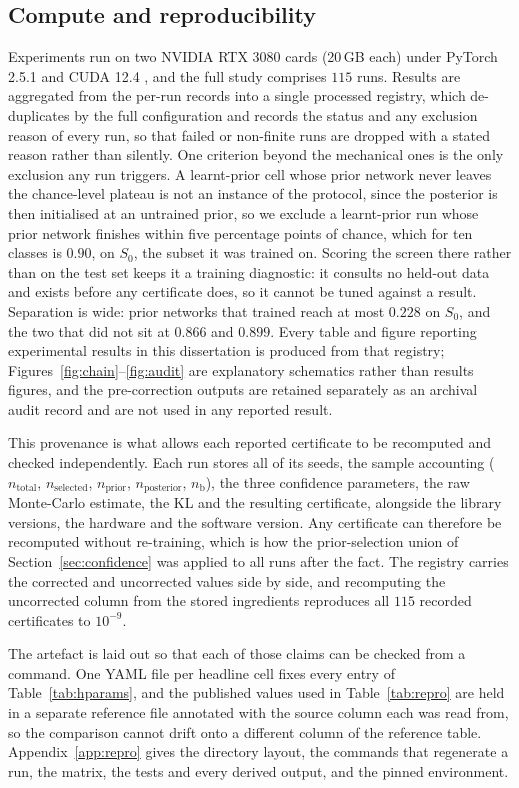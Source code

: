 \subsection{Compute and reproducibility}\label{sec:compute}

Experiments run on two NVIDIA RTX 3080 cards (20\,GB each) under PyTorch 2.5.1
and CUDA 12.4 \parencite{paszke2019}, and the full study comprises $115$ runs. Results are
aggregated from the per-run records into a single processed registry, which
de-duplicates by the full configuration and records the status and any exclusion
reason of every run, so that failed or non-finite runs are dropped with a stated
reason rather than silently. One criterion beyond the mechanical ones is the only
exclusion any run triggers. A
learnt-prior cell whose prior network never leaves the chance-level plateau is
not an instance of the protocol, since the posterior is then initialised at an
untrained prior, so we exclude a learnt-prior run whose prior network finishes
within five percentage points of chance, which for ten classes is $0.90$, on
$S_0$, the subset it was trained on. Scoring the screen there rather than on the
test set keeps it a training diagnostic: it consults no held-out data and exists
before any certificate does, so it cannot be tuned against a result. Separation
is wide: prior networks that trained reach at most $0.228$ on $S_0$, and the two
that did not sit at $0.866$ and $0.899$. Every table and figure reporting
experimental results in this dissertation is produced from that registry;
Figures~\ref{fig:chain}--\ref{fig:audit} are explanatory schematics rather than
results figures, and the pre-correction outputs are retained separately as an
archival audit record and are not used in any reported result.

This provenance is what allows each reported certificate to be recomputed and
checked independently. Each run stores all of its
seeds, the sample accounting ($n_{\mathrm{total}}$, $n_{\mathrm{selected}}$,
$n_{\mathrm{prior}}$, $n_{\mathrm{posterior}}$, $n_{\mathrm b}$), the three
confidence parameters, the raw Monte-Carlo estimate, the KL and the resulting
certificate, alongside the library versions, the hardware and the software version.
Any certificate can therefore be recomputed without re-training, which is how the
prior-selection union of Section~\ref{sec:confidence} was applied to all runs
after the fact. The registry carries the corrected and uncorrected values side by
side, and recomputing
the uncorrected column from the stored ingredients reproduces all $115$ recorded
certificates to $10^{-9}$.

The artefact is laid out so that each of those claims can be checked from a
command. One YAML file per headline cell fixes every entry of
Table~\ref{tab:hparams}, and the published values used in Table~\ref{tab:repro}
are held in a separate reference file annotated with the source column each was
read from, so the comparison cannot drift onto a different column of the
reference table. Appendix~\ref{app:repro} gives the directory layout, the
commands that regenerate a run, the matrix, the tests and every derived output,
and the pinned environment.
